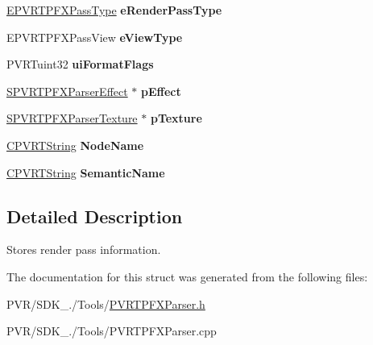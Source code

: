 \begin{DoxyCompactItemize}
\item 
\hypertarget{struct_s_p_v_r_t_p_f_x_render_pass_a9897fc17a019e11e0044fa81d52d0ddc}{\hyperlink{_p_v_r_t_p_f_x_parser_8h_a4b159dd2634ceed4653d6d89d4d70ddb}{E\+P\+V\+R\+T\+P\+F\+X\+Pass\+Type} {\bfseries e\+Render\+Pass\+Type}}\label{struct_s_p_v_r_t_p_f_x_render_pass_a9897fc17a019e11e0044fa81d52d0ddc}

\item 
\hypertarget{struct_s_p_v_r_t_p_f_x_render_pass_ac6f351fcf684f0c6be4bf4f7c5402183}{E\+P\+V\+R\+T\+P\+F\+X\+Pass\+View {\bfseries e\+View\+Type}}\label{struct_s_p_v_r_t_p_f_x_render_pass_ac6f351fcf684f0c6be4bf4f7c5402183}

\item 
\hypertarget{struct_s_p_v_r_t_p_f_x_render_pass_a5b99909cca0ba3154c5e082bc15b3d81}{P\+V\+R\+Tuint32 {\bfseries ui\+Format\+Flags}}\label{struct_s_p_v_r_t_p_f_x_render_pass_a5b99909cca0ba3154c5e082bc15b3d81}

\item 
\hypertarget{struct_s_p_v_r_t_p_f_x_render_pass_a292d2fef3f625dea7fa72237846e5440}{\hyperlink{struct_s_p_v_r_t_p_f_x_parser_effect}{S\+P\+V\+R\+T\+P\+F\+X\+Parser\+Effect} $\ast$ {\bfseries p\+Effect}}\label{struct_s_p_v_r_t_p_f_x_render_pass_a292d2fef3f625dea7fa72237846e5440}

\item 
\hypertarget{struct_s_p_v_r_t_p_f_x_render_pass_a7ff0ede875f4ffee1a385a12ff61554d}{\hyperlink{struct_s_p_v_r_t_p_f_x_parser_texture}{S\+P\+V\+R\+T\+P\+F\+X\+Parser\+Texture} $\ast$ {\bfseries p\+Texture}}\label{struct_s_p_v_r_t_p_f_x_render_pass_a7ff0ede875f4ffee1a385a12ff61554d}

\item 
\hypertarget{struct_s_p_v_r_t_p_f_x_render_pass_a5ff411dde71248aac6d2e25318e38a26}{\hyperlink{class_c_p_v_r_t_string}{C\+P\+V\+R\+T\+String} {\bfseries Node\+Name}}\label{struct_s_p_v_r_t_p_f_x_render_pass_a5ff411dde71248aac6d2e25318e38a26}

\item 
\hypertarget{struct_s_p_v_r_t_p_f_x_render_pass_a250dcb676529d4ed2130f339d3de41b1}{\hyperlink{class_c_p_v_r_t_string}{C\+P\+V\+R\+T\+String} {\bfseries Semantic\+Name}}\label{struct_s_p_v_r_t_p_f_x_render_pass_a250dcb676529d4ed2130f339d3de41b1}

\end{DoxyCompactItemize}


\subsection{Detailed Description}
Stores render pass information. 



 

The documentation for this struct was generated from the following files\+:\begin{DoxyCompactItemize}
\item 
P\+V\+R/\+S\+D\+K\+\_./\+Tools/\hyperlink{_p_v_r_t_p_f_x_parser_8h}{P\+V\+R\+T\+P\+F\+X\+Parser.\+h}\item 
P\+V\+R/\+S\+D\+K\+\_./\+Tools/P\+V\+R\+T\+P\+F\+X\+Parser.\+cpp\end{DoxyCompactItemize}
